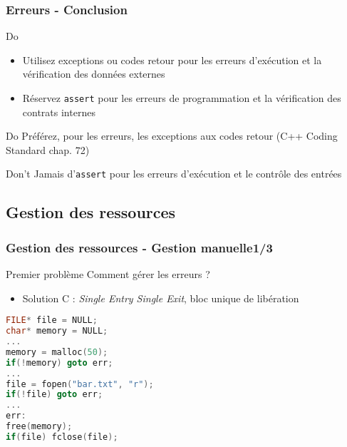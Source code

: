 \documentclass[C++.tex]{subfiles}
\begin{document}
\begin{frame}
	\frametitle{Erreurs - Conclusion}
	\begin{exampleblock}{Do}
		\begin{itemize}
			\item Utilisez exceptions ou codes retour pour les erreurs d'exécution et la vérification des données externes
			\item Réservez \lstinline|assert| pour les erreurs de programmation et la vérification des contrats internes
		\end{itemize}
	\end{exampleblock}

	\begin{exampleblock}{Do}
		Préférez, pour les erreurs, les exceptions aux codes retour (\og C++ Coding Standard\fg{} chap. 72)

	\end{exampleblock}

	\begin{alertblock}{Don't}
		Jamais d'\lstinline|assert| pour les erreurs d'exécution et le contrôle des entrées
	\end{alertblock}
\end{frame}

\subsection*{Gestion des ressources}
\begin{frame}[fragile]
	\frametitle{Gestion des ressources - Gestion manuelle\titlehfill{}1/3}
	\begin{alertblock}{Premier problème}
		Comment gérer les erreurs ?
	\end{alertblock}

	\begin{itemize}
		\item Solution C : \textit{Single Entry Single Exit}, bloc unique de libération
	\end{itemize}

	\begin{lstlisting}[language=C++]
FILE* file = NULL;
char* memory = NULL;
...
memory = malloc(50);
if(!memory) goto err;
...
file = fopen("bar.txt", "r");
if(!file) goto err;
...
err:
free(memory);
if(file) fclose(file);\end{lstlisting}
\end{frame}
\end{document}
